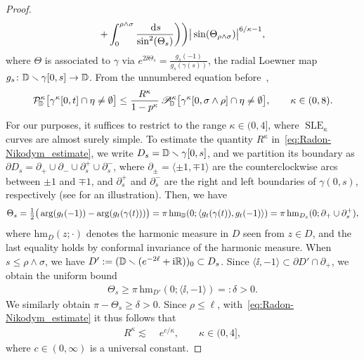 \documentclass[a4paper, 11pt]{article}
\theoremstyle{definition}
\numberwithin{equation}{section}
\numberwithin{figure}{section}
\newcommand{\SLE}[1][]{\operatorname{SLE}_{#1}}
\newcommand{\rDmeas}[1]{\mathcal{P}^{#1}_{\!\bD}}
\newcommand{\cDmeas}[1]{\mathscr{P}^{#1}_{\!\bD}}
\newcommand{\harmonicmeasure}[3]{\mathrm{hm}_{#1}(#2;#3)}
\newcommand{\component}[2]{(#1)_{#2}}
\newcommand{\arc}[2]{\langle#1,#2\rangle}
\begin{document}
\begin{proof}
\begin{align}
\begin{split}
+ \int_0^{\rho\wedge\sigma} \frac{\,\mathrm{d} s}{\sin^2(\Theta_s)}\bigg)\bigg) 
\big|\sin (\Theta_{\rho\wedge\sigma})\big|^{6/\kappa - 1} ,
\end{split}
\end{align} 
where $\Theta$ is associated to $\gamma$ via 
$e^{2\ii\Theta_s} = \frac{g_s(-1)}{g_s(\gamma(s))}$, 
the radial Loewner map $g_s \colon \mathbb{D} \smallsetminus \gamma[0,s] \to \mathbb{D}$.
From the unnumbered equation before~\cite[Equation~(36), proof of Lemma~4.2]{Lawler:Continuity_of_radial_and_two-sided_radial_SLE_at_the_terminal_point},
\begin{align}\label{eqn:crosscut-probability}
\rDmeas{\kappa}\big[\gamma^\kappa[0,t] \cap \eta \ne \emptyset\big] 
\le \frac{R^\kappa}{1-p^\kappa} \, \cDmeas{\kappa}\big[\gamma^\kappa[0,\sigma \wedge \rho] \cap \eta \ne \emptyset\big], \qquad \kappa \in (0,8).
\end{align} 
For our purposes, it suffices to 
restrict to the range $\kappa \in (0,4]$, where $\SLE[\kappa]$ curves are almost surely simple. 
To estimate the quantity $R^{\kappa}$ in~\eqref{eq:Radon-Nikodym_estimate}, we write $D_s = \mathbb{D} \smallsetminus \gamma[0,s]$, 
and we partition its boundary as $\partial D_s = \partial_+\cup \partial_-\cup\partial_s^+\cup\partial_s^-$, 
where $\partial_\pm = \arc{\pm 1}{\mp 1}$ are the counterclockwise arcs between $\pm 1$ and $\mp 1$,
and $\partial_s^+$ and $\partial_s^-$ are the right and left boundaries of $\gamma(0,s)$, respectively 
(see  for an illustration). 
Then, we have
\begin{align*}
\Theta_s = \tfrac{1}{2}\big(\arg(g_t(-1))-\arg(g_t(\gamma(t)))\big) 
= \pi \, \harmonicmeasure{\bD}{0}{\arc{g_t(\gamma(t))}{g_t(-1)}} 
= \pi \, \harmonicmeasure{D_s}{0}{\partial_+\cup\partial_s^+},
\end{align*}
where $\harmonicmeasure{D}{z}{\cdot}$ denotes the harmonic measure in $D$ seen from $z \in D$,
and the last equality holds by conformal invariance of the harmonic measure. 
When $s \le \rho \wedge \sigma$, we have 
$D' := \component{\bD\smallsetminus(e^{-2\ell}+\ii\bR)}{0} \subset D_s$. 
Since $\arc{\ii}{-1} \subset \partial D' \cap \partial_+$, we obtain the uniform bound
\begin{align*}
\Theta_s \ge  \pi \, \harmonicmeasure{D'}{0}{\arc{\ii}{-1}} =: \delta > 0 .
\end{align*}
We similarly obtain $\pi - \Theta_s \ge \delta > 0$. 
Since $\rho \le \ell$, with~\eqref{eq:Radon-Nikodym_estimate} it thus follows that 
\begin{align}\label{eq:Radon-Nikodym_estimate_exp}
R^{\kappa} \lesssim \;& e^{c/\kappa} , \qquad \kappa \in (0,4] ,
\end{align} 
where $c \in (0,\infty)$ is a universal constant. 



\end{proof}
\end{document}

